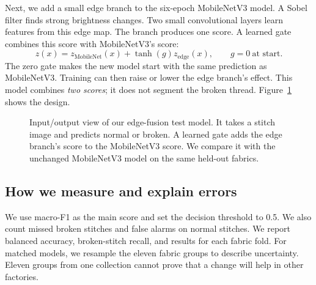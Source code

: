 \documentclass[conference,a4paper]{IEEEtran}
\begin{document}
Next, we add a small edge branch to the six-epoch MobileNetV3 model. A Sobel filter finds strong brightness changes. Two small convolutional layers learn features from this edge map. The branch produces one score. A learned gate combines this score with MobileNetV3's score:
\begin{equation}
 z(x)=z_{\mathrm{MobileNet}}(x)+\tanh(g)z_{\mathrm{edge}}(x),\qquad g=0\ \text{at start}.
\label{eq:fusion}
\end{equation}
The zero gate makes the new model start with the same prediction as MobileNetV3. Training can then raise or lower the edge branch's effect. This model combines \emph{two scores}; it does not segment the broken thread. Figure~\ref{fig:fusion} shows the design.

\begin{figure}[!t]\centering
{}
\caption{Input/output view of our edge-fusion test model. It takes a stitch image and predicts normal or broken. A learned gate adds the edge branch's score to the MobileNetV3 score. We compare it with the unchanged MobileNetV3 model on the same held-out fabrics.}\label{fig:fusion}
\end{figure}

\subsection{How we measure and explain errors}
We use macro-F1 as the main score and set the decision threshold to 0.5. We also count missed broken stitches and false alarms on normal stitches. We report balanced accuracy, broken-stitch recall, and results for each fabric fold. For matched models, we resample the eleven fabric groups to describe uncertainty. Eleven groups from one collection cannot prove that a change will help in other factories.
\end{document}
